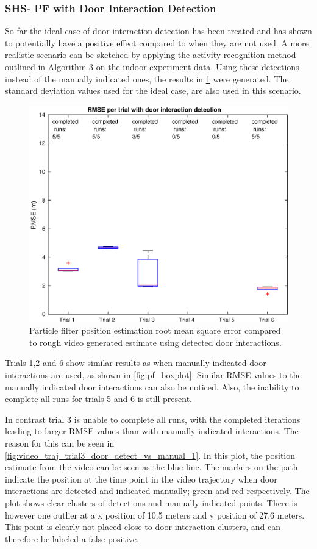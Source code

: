 \subsubsection{SHS- PF with Door Interaction Detection}
So far the ideal case of door interaction detection has been treated and has shown to potentially have a positive effect compared to when they are not used. A more realistic scenario can be sketched by applying the activity recognition method outlined in Algorithm 3 on the indoor experiment data. Using these detections instead of the manually indicated ones, the results in \cref{fig:rmse_per_trial_with_activity_recognition} were generated. The standard deviation values used for the ideal case, are also used in this scenario.

\begin{figure}[H]
	\centering
	\includegraphics[width=0.7\linewidth]{images/20201201_1851_RMSE_per_trial_with_door_interaction_detection}
	\caption[Particle Filter position estimation performance with door interaction]{Particle filter position estimation root mean square error compared to rough video generated estimate using detected door interactions.}
	\label{fig:rmse_per_trial_with_activity_recognition}
\end{figure}

Trials 1,2 and 6 show similar results as when manually indicated door interactions are used, as shown in \cref{fig:pf_boxplot}. Similar RMSE values to the manually indicated door interactions can also be noticed. Also, the inability to complete all runs for trials 5 and 6 is still present. \par 

In contrast trial 3 is unable to complete all runs, with the completed iterations leading to larger RMSE values than with manually indicated interactions. The reason for this can be seen in \cref{fig:video_traj_trial3_door_detect_vs_manual_1}. In this plot, the position estimate from the video can be seen as the blue line. The markers on the path indicate the position at the time point in the video trajectory when door interactions are detected and indicated manually; green and red respectively. The plot shows clear clusters of detections and manually indicated points. There is however one outlier at a  x position of 10.5 meters and y position of 27.6 meters. This point is clearly not placed close to door interaction clusters, and can therefore be labeled a false positive. \par 

